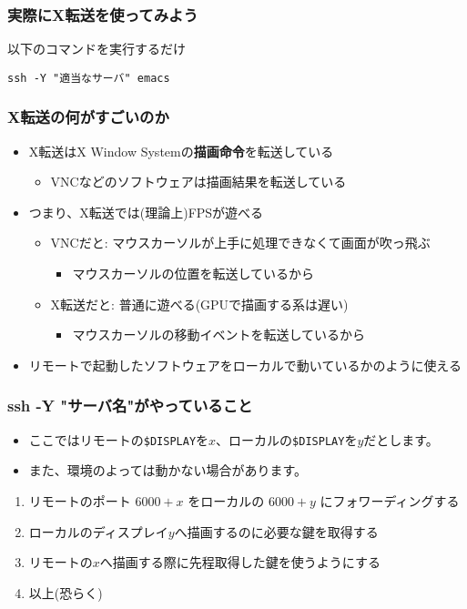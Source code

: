 \documentclass{beamer}
\begin{document}
\begin{frame}
  \frametitle{実際にX転送を使ってみよう}

  以下のコマンドを実行するだけ

  \begin{tcolorbox}[title=emacsをローカルに転送する例]
    \texttt{ssh -Y "適当なサーバ" emacs}
  \end{tcolorbox}
\end{frame}

\begin{frame}
  \frametitle{X転送の何がすごいのか}
  \begin{itemize}
  \item X転送はX Window Systemの\textbf{描画命令}を転送している
    \begin{itemize}
    \item VNCなどのソフトウェアは描画結果を転送している
    \end{itemize}
  \item<2-> つまり、X転送では(理論上)FPSが遊べる
    \begin{itemize}
    \item VNCだと: マウスカーソルが上手に処理できなくて画面が吹っ飛ぶ
      \begin{itemize}
      \item<3-> マウスカーソルの位置を転送しているから
      \end{itemize}
    \item X転送だと: 普通に遊べる(GPUで描画する系は遅い)
      \begin{itemize}
      \item<3-> マウスカーソルの移動イベントを転送しているから
      \end{itemize}
    \end{itemize}
  \item<4> リモートで起動したソフトウェアをローカルで動いているかのように使える
  \end{itemize}
\end{frame}

\begin{frame}
  \frametitle{ssh -Y "サーバ名"がやっていること}
  \begin{tcolorbox}[title=注意]
    \begin{itemize}
    \item ここではリモートの\texttt{\$DISPLAY}を$x$、ローカルの\texttt{\$DISPLAY}を$y$だとします。
    \item また、環境のよっては動かない場合があります。
    \end{itemize}
  \end{tcolorbox}
  \begin{enumerate}
  \item<2-> リモートのポート $6000 + x$ をローカルの $6000 + y$ にフォワーディングする
  \item<3-> ローカルのディスプレイ$y$へ描画するのに必要な鍵を取得する
  \item<4-> リモートの$x$へ描画する際に先程取得した鍵を使うようにする
  \item<5-> 以上(恐らく)
  \end{enumerate}
\end{frame}
\end{document}
